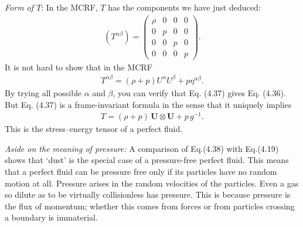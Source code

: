 \documentclass[12pt]{book}
\begin{document}
    \textit{Form of  \(T\)}: In the MCRF, \(T\) has the components we have just deduced:
    \begin{align}
    (T^{\alpha\beta}) =
    \begin{pmatrix}
    \rho & 0 & 0 & 0 \\
    0 & p & 0 & 0 \\
    0 & 0 & p & 0 \\
    0 & 0 & 0 & p
    \end{pmatrix}.
    \tag{4.36}
    \end{align}
    It is not hard to show that in the MCRF
    \begin{align}
    T^{\alpha\beta} = (\rho + p) U^\alpha U^\beta + p \eta^{\alpha\beta}. \tag{4.37}
    \end{align}
    By trying all possible \(\alpha\) and \(\beta\), you can verify that Eq. (4.37) gives Eq. (4.36). But Eq. (4.37) is a frame-invariant formula in the sense that it uniquely implies
    \begin{align}
    T = (\rho + p) \, \mathbf{U} \otimes \mathbf{U} + p \, g^{-1}. \tag{4.38}
    \end{align}
    This is the stress–energy tensor of a perfect fluid.

    \textit{Aside on the meaning of pressure:}
    A comparison of Eq.(4.38) with Eq.(4.19) shows that ‘dust’ is the special case of a pressure-free perfect fluid. This means that a perfect fluid can be pressure free only if its particles have no random motion at all. Pressure arises in the random velocities of the particles. Even a gas so dilute as to be virtually collisionless has pressure. This is because pressure is the flux of momentum; whether this comes from forces or from particles crossing a boundary is immaterial.
\end{document}
